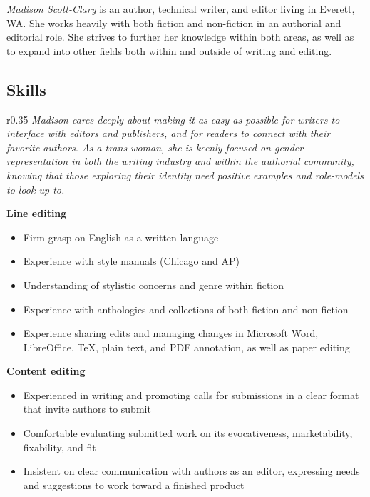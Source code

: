 \documentclass[letterpaper]{memoir}
\begin{document}


\noindent\textit{\large Madison Scott-Clary} is an author, technical writer, and editor living in Everett, WA. She works heavily with both fiction and non-fiction in an authorial and editorial role. She strives to further her knowledge within both areas, as well as to expand into other fields both within and outside of writing and editing.

\subsection{Skills}

\begin{wrapfigure}{r}{0.35\linewidth}
  \textit{\color{titlegreydark} \large Madison cares deeply about making it as easy as possible for writers to interface with editors and publishers, and for readers to connect with their favorite authors. As a trans woman, she is keenly focused on gender representation in both the writing industry and within the authorial community, knowing that those exploring their identity need positive examples and role-models to look up to.}
  \vspace{-1in}
\end{wrapfigure}

\textbf{Line editing}

\begin{itemize}
  \item Firm grasp on English as a written language
  \item Experience with style manuals (Chicago and AP)
  \item Understanding of stylistic concerns and genre within fiction
  \item Experience with anthologies and collections of both fiction and non-fiction
  \item Experience sharing edits and managing changes in Microsoft Word, LibreOffice, \TeX, plain text, and PDF annotation, as well as paper editing
\end{itemize}

\hspace{-1.5em}\textbf{Content editing}

\begin{itemize}
  \item Experienced in writing and promoting calls for submissions in a clear format that invite authors to submit
  \item Comfortable evaluating submitted work on its evocativeness, marketability, fixability, and fit
  \item Insistent on clear communication with authors as an editor, expressing needs and suggestions to work toward a finished product
\end{itemize}
\end{document}
